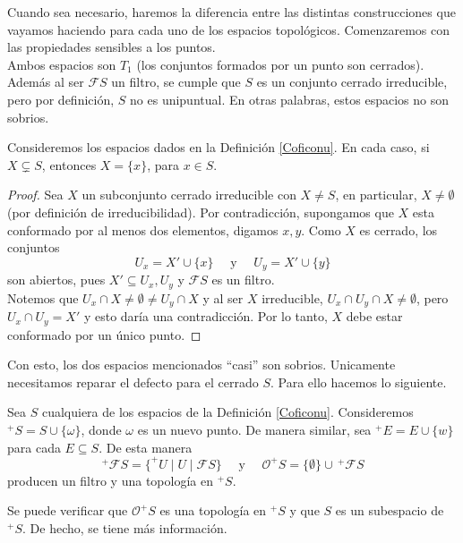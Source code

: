 Cuando sea necesario, haremos la diferencia entre las distintas construcciones que vayamos haciendo para cada uno de los espacios topológicos. Comenzaremos con las propiedades sensibles a los puntos.\\

Ambos espacios son $T_1$ (los conjuntos formados por un punto son cerrados). Además al ser $\mathcal{F}S$ un filtro, se cumple que $S$ es un conjunto cerrado irreducible, pero por definición, $S$ no es unipuntual. En otras palabras, estos espacios no son sobrios.

\begin{lem}\label{Lema10.1.2}
    Consideremos los espacios dados en la Definición \ref{Coficonu}. En cada caso, si $X\subsetneq S$, entonces $X=\{x\}$, para $x\in S$. 
\end{lem}

\begin{proof}
    Sea $X$ un subconjunto cerrado irreducible con $X\neq S$, en particular, $X\neq \emptyset$ (por definición de irreducibilidad). Por contradicción, supongamos que $X$ esta conformado por al menos dos elementos, digamos $x, y$. Como $X$ es cerrado, los conjuntos
    \[
    U_x=X'\cup \{x\}\quad\mbox{ y }\quad U_y=X'\cup \{y\}
    \]
    son abiertos, pues $X'\subseteq U_x, U_y$ y $\mathcal{F}S$ es un filtro.\\

    Notemos que $U_x\cap X\neq \emptyset \neq U_y\cap X$ y al ser $X$ irreducible, $U_x\cap U_y\cap X\neq \emptyset$, pero $U_x\cap U_y=X'$ y esto daría una contradicción. Por lo tanto, $X$ debe estar conformado por un único punto.
\end{proof}

Con esto, los dos espacios mencionados ``casi'' son sobrios. Unicamente necesitamos reparar el defecto para el cerrado $S$. Para ello hacemos lo siguiente.

\begin{dfn}\label{Definición10.1.3}
    Sea $S$ cualquiera de los espacios de la Definición \ref{Coficonu}. Consideremos $^+S=S\cup \{\omega\}$, donde $\omega$ es un nuevo punto. De manera similar, sea $^+E=E\cup \{w\}$ para cada $E\subseteq S$. De esta manera
    \[
    ^+\mathcal{F}S=\{^+U\mid U\mid \mathcal{F}S\}\quad \mbox{ y }\quad \mathcal{O}^+S=\{\emptyset\}\cup \,^+\mathcal{F}S
    \]
    producen un filtro y una topología en $^+S$.
\end{dfn}

Se puede verificar que $\mathcal{O}^+S$ es una topología en $^+S$ y que $S$ es un subespacio de $^+S$. De hecho, se tiene más información.

